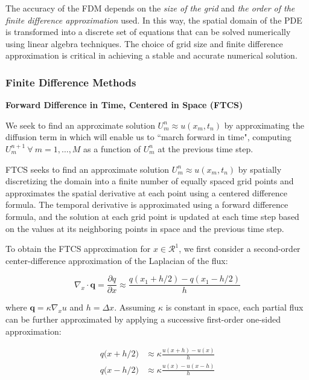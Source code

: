 The accuracy of the FDM depends on the \textit{size of the grid} and \textit{the order of the finite difference approximation} used. In this way, the spatial domain of the PDE is transformed into a discrete set of equations that can be solved numerically using linear algebra techniques. The choice of grid size and finite difference approximation is critical in achieving a stable and accurate numerical solution.

\subsubsection{Finite Difference Methods}
\noindent\textbf{Forward Difference in Time, Centered in Space (FTCS)}

We seek to find an approximate solution $U_m^n \approx u(x_m, t_n)$ by approximating the diffusion term in  which will enable us to ``march forward in time", computing $U_m^{n+1} \ \forall \ m = 1, \dots, M$ as a function of $U_m^n$ at the previous time step. 

FTCS seeks to find an approximate solution $U_m^n \approx u(x_m, t_n)$ by spatially discretizing the domain into a finite number of equally spaced grid points and approximates the spatial derivative at each point using a centered difference formula. The temporal derivative is approximated using a forward difference formula, and the solution at each grid point is updated at each time step based on the values at its neighboring points in space and the previous time step.

To obtain the FTCS approximation for $x \in \mathcal{R}^1$, we first consider a second-order center-difference approximation \cite{leveque_fdm} of the Laplacian of the flux:


\begin{equation}
    \nabla_x \cdot \boldsymbol{q} = \frac{\partial q}{\partial x} \approx \frac{q(x_1 + h/2) - q(x_1 - h/2)}{h}
\end{equation}

where $\boldsymbol{q} = \kappa \nabla_x u$ and $h = \Delta x$. Assuming $\kappa$ is constant in space, each partial flux can be further approximated by applying a successive first-order one-sided approximation: 

\begin{align}
    q\big(x + h/2\big) &\approx \kappa \frac{u(x+h) - u(x)}{h} \\
    q\big(x - h/2\big) &\approx \kappa \frac{u(x) - u(x-h)}{h}
\end{align}


